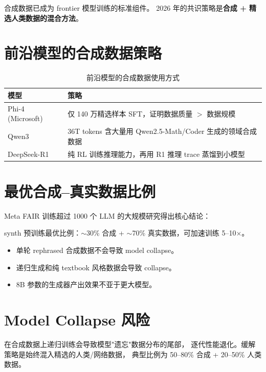 \documentclass[
  customlatinfont = macos,
]{hkustthesis}
\begin{document}
合成数据已成为 frontier 模型训练的标准组件。
2026 年的共识策略是\textbf{合成 + 精选人类数据的混合方法}。

\section{前沿模型的合成数据策略}

\begin{table}[H]
\centering\small
\caption{前沿模型的合成数据使用方式}
\begin{tabularx}{\linewidth}{l X}
\toprule
\textbf{模型} & \textbf{策略} \\
\midrule
Phi-4 (Microsoft) & 仅 140 万精选样本 SFT，证明数据质量 $>$ 数据规模 \\
Qwen3             & 36T tokens 含大量用 Qwen2.5-Math/Coder 生成的领域合成数据 \\
DeepSeek-R1       & 纯 RL 训练推理能力，再用 R1 推理 trace 蒸馏到小模型 \\
\bottomrule
\end{tabularx}
\end{table}

\section{最优合成--真实数据比例}

Meta FAIR 训练超过 1000 个 LLM 的大规模研究得出核心结论：
\begin{insightbox}{synth}
预训练最优比例：$\sim$30\% 合成 + $\sim$70\% 真实数据，可加速训练 5--10$\times$。
\begin{itemize}[noitemsep]
  \item 单轮 rephrased 合成数据不会导致 model collapse。
  \item 递归生成和纯 textbook 风格数据会导致 collapse。
  \item 8B 参数的生成器产出效果不亚于更大模型。
\end{itemize}
\end{insightbox}

\section{Model Collapse 风险}

在合成数据上递归训练会导致模型"遗忘"数据分布的尾部，
逐代性能退化。缓解策略是始终混入精选的人类/网络数据，
典型比例为 50--80\% 合成 + 20--50\% 人类数据。


\end{document}

